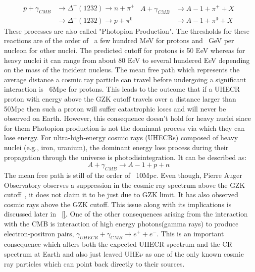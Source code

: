 \begin{equation}\label{eq:GZK}
  \begin{split}
    p + \gamma_{CMB} &\longrightarrow \Delta^+(1232 ) \longrightarrow n+\pi^+ \\ 
                     &\longrightarrow \Delta^+(1232 ) \longrightarrow p+\pi^0
  \end{split} 
  \begin{split}
    A + \gamma_{CMB} &\longrightarrow A-1 + \pi^+ + X \\ 
                     &\longrightarrow A-1 + \pi^0 + X
  \end{split} 
\end{equation}
These processes are also called "Photopion Production". The thresholds for these reactions are of the order of ~a few hundred MeV for protons and ~GeV per nucleon for other nuclei. The predicted cutoff for protons is 50 EeV whereas for heavy nuclei it can range from about 80 EeV to several hundered EeV depending on the mass of the incident nucleus. The mean free path which represents the average distance a cosmic ray particle can travel before undergoing a significant interaction is ~6Mpc for protons. This leads to the outcome that if a UHECR proton with energy above the GZK cutoff travels over a distance larger than 50Mpc then such a proton will suffer catastrophic loses and will never be observed on Earth. However, this consequence doesn't hold for heavy nuclei since for them Photopion production is not the dominant process via which they can lose energy. For ultra-high-energy cosmic rays (UHECRs) composed of heavy nuclei (e.g., iron, uranium), the dominant energy loss process during their propagation through the universe is photodisintegration. It can be described as:
\begin{equation}\label{eq:Pdisinteg}
    A + \gamma_{CMB} \longrightarrow A-1 + p + n  
\end{equation}
The mean free path is still of the order of ~10Mpc.
Even though, Pierre Auger Observatory observes a suppression in the cosmic ray spectrum above the GZK cutoff~\cite{}, it does not claim it to be just due to GZK limit. It has also observed cosmic rays above the GZK cutoff. This issue along with its implications is discussed later in ~\ref{}. One of the other consequences arising from the interaction with the CMB is interaction of high energy photons(gamma rays) to produce electron-positron pairs, $\gamma_{UHECR} + \gamma_{CMB} \longrightarrow e^+ + e^- $. This is an important consequence which alters both the expected UHECR spectrum and the CR spectrum at Earth and also just leaved UHE$\nu$ as one of the only known cosmic ray particles which can point back directly to their sources.

